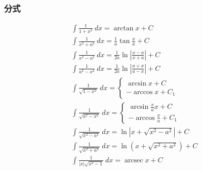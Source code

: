 \subsubsection{分式}
\begin{align}
    &\int \frac{1}{1+x^2}\ dx=\arctan x + C\\
&\int\frac{1}{x^2+a^2} \ dx =\frac{1}{a} \tan \frac{x}{a} + C\\
&\int \frac{1}{x^2-a^2}\ dx=\frac{1}{2a}\ln\left|\frac{x-a}{x+a}\right|+C\\
&\int \frac{1}{a^2-x^2}\ dx=\frac{1}{2a}\ln\left|\frac{a+x}{a-x}\right|+C\\
&\int\frac{1}{\sqrt{1-x^2}}\ dx=\begin{cases}
    \arcsin x + C\\
    -\arccos x +C_1
\end{cases}  \\
&\int\frac{1}{\sqrt{a^2-x^2}}\ dx=\begin{cases}
    \arcsin \frac{x}{a}x + C\\
    -\arccos \frac{x}{a} +C_1
\end{cases}  \\
&\int\frac{1}{\sqrt{x^2-a^2}}\ dx=\ln \left|x+\sqrt{x^2-a^2}\right|+C\\
&\int\frac{1}{\sqrt{x^2+a^2}}\ dx=\ln(x+\sqrt{x^2+a^2})+C\\
&\int\frac{1}{\left|x\right|\sqrt{x^2-1}}\ dx= \operatorname{arcsec} x + C 
\end{align}
